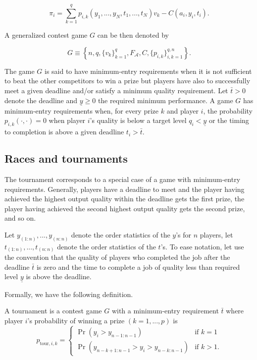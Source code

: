 \documentclass[12pt,]{article}
\newcommand\deadline{\bar{t}}
\newcommand\target{\underline{y}}
\newcommand\tournament{\text{tour}}
\begin{document}
\begin{equation}
  \label{expected payoff}
  \pi_i = \sum_{k=1}^{q} p_{i, k}(y_1,..., y_N, t_1, ..., t_N) v_k - C(a_i, y_i, t_i). 
\end{equation}

A generalized contest game \(G\) can be then denoted by

\begin{equation}
G \equiv \left\{
    n, q, \{v_k\}_{k=1}^{q},  F_\mathcal{A}, C, \{p_{i,k}\}_{i,k=1}^{q,n} 
  \right\}.
\end{equation}

The game \(G\) is said to have minimum-entry requirements when it is not
sufficient to beat the other competitors to win a prize but players have
also to successfully meet a given deadline and/or satisfy a minimum
quality requirement. Let \(\deadline>0\) denote the deadline and
\(\target\geq 0\) the required minimum performance. A game \(G\) has
minimum-entry requirements when, for every prize \(k\) and player \(i\),
the probability \(p_{i, k}(\cdot, \cdot)=0\) when player \(i\)'s quality
is below a target level \(q_i < \target\) or the timing to completion is
above a given deadline \(t_i>\deadline\).

\subsection{Races and tournaments}\label{races-and-tournaments}

The tournament corresponds to a special case of a game with
minimum-entry requirements. Generally, players have a deadline to meet
and the player having achieved the highest output quality within the
deadline gets the first prize, the player having achieved the second
highest output quality gets the second prize, and so on.

Let \(y_{(1:n)}, ..., y_{(n:n)}\) denote the order statistics of the
\(y\)'s for \(n\) players, let \(t_{(1:n)}, ..., t_{(n:n)}\) denote the
order statistics of the \(t\)'s. To ease notation, let use the
convention that the quality of players who completed the job after the
deadline \(\deadline\) is zero and the time to complete a job of quality
less than required level \(\target\) is above the deadline.

Formally, we have the following definition.

\begin{definition}
A tournament is a contest game $G$ with a minimum-entry requirement $\deadline$ where player $i$'s probability of winning a prize $(k=1,...,p)$ is
\begin{equation}
  p_{\tournament, i, k} =
  \begin{cases}
    \Pr(y_i > y_{n-1:n-1}) & \text{if }k=1\\
    \Pr(y_{n-k+1:n-1} > y_i > y_{n-k:n-1}) & \text{if }k>1.
  \end{cases}
\end{equation}
\end{definition}
\end{document}
